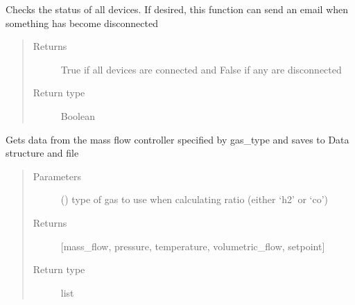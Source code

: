 \documentclass[letterpaper,10pt,english]{sphinxmanual}
\begin{document}
\begin{fulllineitems}
\begin{fulllineitems}
\end{fulllineitems}


\begin{fulllineitems}
\label{\detokenize{source/laboratory:laboratory.setup.Setup.device_status}}
Checks the status of all devices. If desired, this function can send an email when something has become disconnected
\begin{quote}\begin{description}
\item[{Returns}] \leavevmode
True if all devices are connected and False if any are disconnected

\item[{Return type}] \leavevmode
Boolean

\end{description}\end{quote}

\end{fulllineitems}


\begin{fulllineitems}
\label{\detokenize{source/laboratory:laboratory.setup.Setup.get_gas}}
Gets data from the mass flow controller specified by gas\_type and saves to Data structure and file
\begin{quote}\begin{description}
\item[{Parameters}] \leavevmode
{} () \textendash{} type of gas to use when calculating ratio (either ‘h2’ or ‘co’)

\item[{Returns}] \leavevmode
{[}mass\_flow, pressure, temperature, volumetric\_flow, setpoint{]}

\item[{Return type}] \leavevmode
list

\end{description}\end{quote}


\end{fulllineitems}
\end{fulllineitems}
\end{document}
